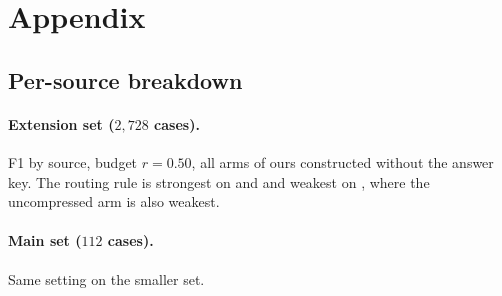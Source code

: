 \section{Appendix}
\label{sec:appendix}

\subsection{Per-source breakdown}

\paragraph{Extension set ($2{,}728$ cases).}
F1 by source, budget $r=0.50$, all arms of ours constructed without the answer key. The
routing rule is strongest on  and  and weakest on
, where the uncompressed arm is also weakest.

\begin{table}[t]
\caption{Per-source F1 on the extension set ($2{,}728$ cases, $r=0.50$).}
\label{tab:app_persource_ext}
\centering\small
\setlength{\tabcolsep}{3pt}
\end{table}

\paragraph{Main set ($112$ cases).}
Same setting on the smaller set.

